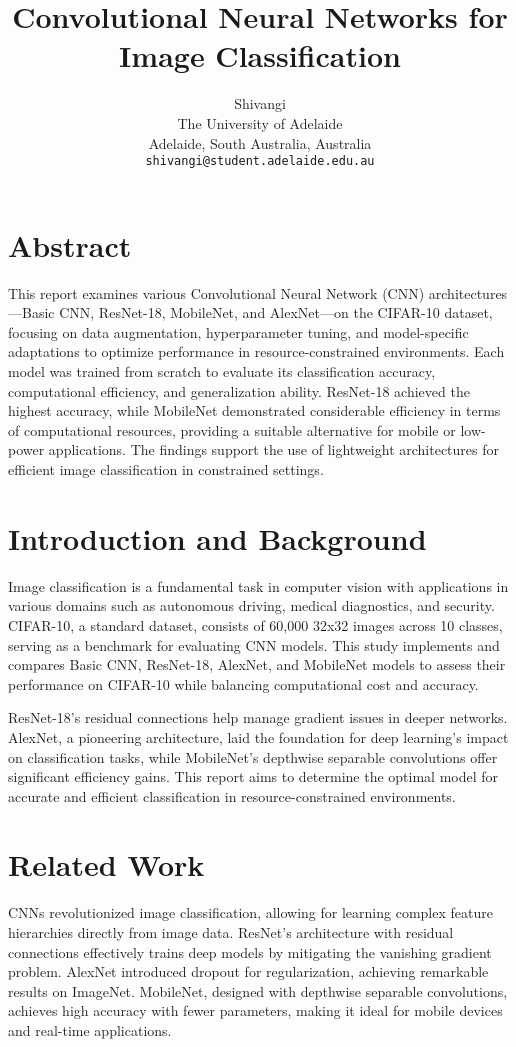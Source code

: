 \documentclass[10pt,twocolumn,letterpaper]{article}
\title{Convolutional Neural Networks for Image Classification}
\author{Shivangi \\
The University of Adelaide\\
Adelaide, South Australia, Australia\\
{\tt\small shivangi@student.adelaide.edu.au}
}
\begin{document}
\maketitle

\section{Abstract}
This report examines various Convolutional Neural Network (CNN) architectures—Basic CNN, ResNet-18, MobileNet, and AlexNet—on the CIFAR-10 dataset, focusing on data augmentation, hyperparameter tuning, and model-specific adaptations to optimize performance in resource-constrained environments. Each model was trained from scratch to evaluate its classification accuracy, computational efficiency, and generalization ability. ResNet-18 achieved the highest accuracy, while MobileNet demonstrated considerable efficiency in terms of computational resources, providing a suitable alternative for mobile or low-power applications. The findings support the use of lightweight architectures for efficient image classification in constrained settings.
\section{Introduction and Background}
Image classification is a fundamental task in computer vision with applications in various domains such as autonomous driving, medical diagnostics, and security. CIFAR-10, a standard dataset, consists of 60,000 32x32 images across 10 classes, serving as a benchmark for evaluating CNN models. This study implements and compares Basic CNN, ResNet-18, AlexNet, and MobileNet models to assess their performance on CIFAR-10 while balancing computational cost and accuracy.

ResNet-18's residual connections help manage gradient issues in deeper networks. AlexNet, a pioneering architecture, laid the foundation for deep learning's impact on classification tasks, while MobileNet's depthwise separable convolutions offer significant efficiency gains. This report aims to determine the optimal model for accurate and efficient classification in resource-constrained environments.
\section{Related Work}
CNNs revolutionized image classification, allowing for learning complex feature hierarchies directly from image data. ResNet’s architecture with residual connections effectively trains deep models by mitigating the vanishing gradient problem. AlexNet introduced dropout for regularization, achieving remarkable results on ImageNet. MobileNet, designed with depthwise separable convolutions, achieves high accuracy with fewer parameters, making it ideal for mobile devices and real-time applications.
\end{document}
